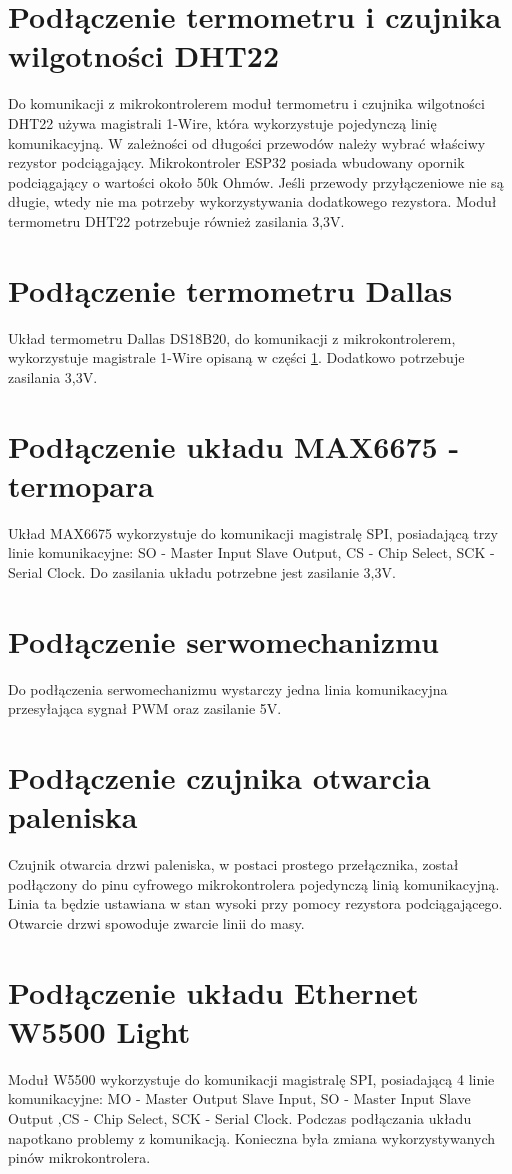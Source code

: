 \documentclass[11pt]{report}
\begin{document}
 \section{Podłączenie termometru i czujnika wilgotności DHT22}\label{dht}
 Do komunikacji z mikrokontrolerem moduł termometru i czujnika wilgotności DHT22  używa magistrali 1-Wire, która wykorzystuje pojedynczą linię komunikacyjną. W zależności od długości przewodów należy wybrać właściwy rezystor podciągający.  Mikrokontroler ESP32 posiada wbudowany opornik podciągający o wartości około 50k Ohmów. Jeśli przewody przyłączeniowe nie są długie, wtedy nie ma potrzeby wykorzystywania dodatkowego rezystora.
 Moduł termometru DHT22 potrzebuje również zasilania 3,3V.
 
 \section{Podłączenie termometru Dallas}
 Układ termometru Dallas DS18B20, do komunikacji z mikrokontrolerem, wykorzystuje magistrale 1-Wire opisaną w części \ref{dht}. Dodatkowo potrzebuje zasilania 3,3V.
 
 \section{Podłączenie układu MAX6675 - termopara}
 Układ MAX6675 wykorzystuje do komunikacji magistralę SPI, posiadającą trzy linie komunikacyjne: SO - Master Input Slave Output, CS - Chip Select, SCK - Serial Clock. Do zasilania układu potrzebne jest zasilanie 3,3V.
 
 \section{Podłączenie serwomechanizmu}
 Do podłączenia serwomechanizmu wystarczy jedna linia komunikacyjna przesyłająca sygnał PWM oraz zasilanie 5V.
 
 \section{Podłączenie czujnika otwarcia paleniska}
 Czujnik otwarcia drzwi paleniska, w postaci prostego przełącznika, został podłączony do pinu cyfrowego mikrokontrolera pojedynczą linią komunikacyjną. Linia ta będzie ustawiana w stan wysoki przy pomocy rezystora podciągającego. Otwarcie drzwi spowoduje zwarcie linii do masy. 
 
  \section{Podłączenie układu Ethernet W5500 Light}
 Moduł W5500 wykorzystuje do komunikacji magistralę SPI, posiadającą 4 linie komunikacyjne: MO - Master Output Slave Input, SO - Master Input Slave Output ,CS - Chip Select, SCK - Serial Clock.
 Podczas podłączania układu napotkano problemy z komunikacją. Konieczna była zmiana wykorzystywanych pinów mikrokontrolera.
 
\end{document}
